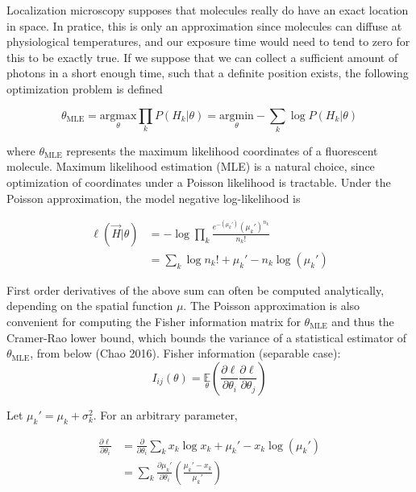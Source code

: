 \documentclass{ucetd}
\begin{document}
Localization microscopy supposes that molecules really do have an exact location in space. In pratice, this is only an approximation since molecules can diffuse at physiological temperatures, and our exposure time would need to tend to zero for this to be exactly true. If we suppose that we can collect a sufficient amount of photons in a short enough time, such that a definite position exists, the following optimization problem is defined

\begin{equation*}
\theta_{\mathrm{MLE}} = \underset{\theta}{\mathrm{argmax}}\prod_{k}P(H_{k}|\theta)= \underset{\theta}{\mathrm{argmin}}-\sum_{k}\log P(H_{k}|\theta)
\end{equation*}


where $\theta_{\mathrm{MLE}}$ represents the maximum likelihood coordinates of a fluorescent molecule. Maximum likelihood estimation (MLE) is a natural choice, since optimization of coordinates under a Poisson likelihood is tractable. Under the Poisson approximation, the model negative log-likelihood is

\begin{align}
\ell(\vec{H}|\theta) &= -\log \prod_{k} \frac{e^{-\left(\mu_{k}'\right)}\left(\mu_{k}'\right)^{n_{k}}}{n_{k}!}\\
&= \sum_{k}  \log n_{k}! + \mu_{k}' - n_{k}\log\left(\mu_{k}'\right)
\end{align}

First order derivatives of the above sum can often be computed analytically, depending on the spatial function $\mu$. The Poisson approximation is also convenient for computing the Fisher information matrix for $\theta_{\mathrm{MLE}}$ and thus the Cramer-Rao lower bound, which bounds the variance of a statistical estimator of $\theta_{\mathrm{MLE}}$, from below (Chao 2016).
Fisher information (separable case): \begin{equation}
I_{ij}(\theta) = \underset{\theta}{\mathbb{E}}\left(\frac{\partial \ell}{\partial\theta_{i}}\frac{\partial\ell}{\partial\theta_{j}}\right) 
\end{equation}

Let $\mu_{k}' = \mu_{k} + \sigma_{k}^{2}$. For an arbitrary parameter,

\begin{align*}
\frac{\partial \ell}{\partial \theta_{i}} &= \frac{\partial}{\partial \theta_{i}} \sum_{k}  x_{k}\log x_{k} + \mu_{k}' - x_{k}\log\left(\mu_{k}'\right)\\
&= \sum_{k} \frac{\partial \mu_{k}'}{\partial\theta_{i}} \left(\frac{\mu_{k}'-x_{k}}{\mu_{k}'}\right)
\end{align*}
\end{document}
